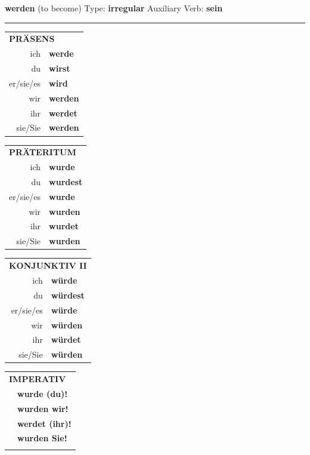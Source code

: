 \documentclass[10pt,a4paper]{revtex4-2}
\begin{document}
\begin{verbbox-acc}
    {\Large \bf werden} (to become) \hfill Type: \textbf{irregular} \hfill Auxiliary Verb: \textbf{sein} 
     \vspace{5pt}
    \hrule
    \vspace{5pt}
  \begin{tabular}{rl}
     \multicolumn{2}{l}{\textbf{PRÄSENS} }\\
    ich & \textbf{werde}\\
    du & \textbf{wirst}\\
    er/sie/es & \textbf{wird}\\
    wir & \textbf{werden}\\
    ihr & \textbf{werdet}\\
    sie/Sie & \textbf{werden}\\
  \end{tabular}
  \hfill
     \begin{tabular}{rl}
    \multicolumn{2}{l}{\textbf{PRÄTERITUM} }\\
    ich & \textbf{wurde}\\
    du & \textbf{wurdest}\\
    er/sie/es & \textbf{wurde}\\
    wir & \textbf{wurden}\\
    ihr & \textbf{wurdet}\\
    sie/Sie & \textbf{wurden}\\
  \end{tabular}
    \hfill
     \begin{tabular}{rl}
    \multicolumn{2}{l}{\textbf{KONJUNKTIV II} }\\
    ich & \textbf{würde}\\
    du & \textbf{würdest}\\
    er/sie/es & \textbf{würde}\\
    wir & \textbf{würden}\\
    ihr & \textbf{würdet}\\
    sie/Sie & \textbf{würden}\\
  \end{tabular}
  \hfill
  \begin{tabular}{rl}
     \multicolumn{2}{l}{\textbf{IMPERATIV} }\\
   & \textbf{wurde (du)!}\\
   & \textbf{wurden wir!}\\
   & \textbf{werdet (ihr)!}\\
   & \textbf{wurden Sie!}\\
   & \vspace{10pt}
  \end{tabular}


\end{verbbox-acc}
\end{document}
